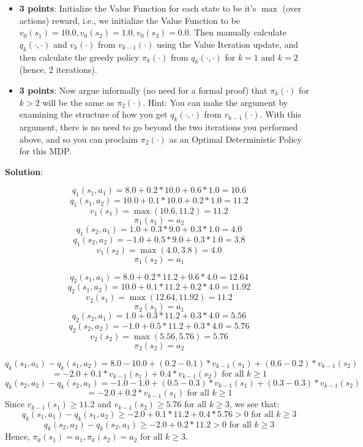 \documentclass[12pt]{exam}
\begin{document}
\begin{questions}
\begin{itemize}
\item {\bf 3 points}: Initialize the Value Function for each state to be it's $\max$ (over actions) reward, i.e., we initialize the Value Function to be $v_0(s_1) = 10.0, v_0(s_2) = 1.0, v_0(s_3) = 0.0$. Then manually calculate $q_k(\cdot, \cdot)$ and $v_k(\cdot)$ from $v_{k - 1}( \cdot)$ using the Value Iteration update, and then calculate the greedy policy $\pi_k(\cdot)$ from $q_k(\cdot, \cdot)$ for $k = 1$ and $k = 2$ (hence, 2 iterations).

\item {\bf 3 points}: Now argue informally (no need for a formal proof) that $\pi_k(\cdot)$ for $k > 2$ will be the same as $\pi_2(\cdot)$. Hint: You can make the argument by examining the structure of how you get $q_k(\cdot, \cdot)$ from $v_{k-1}(\cdot)$. With this argument, there is no need to go beyond the two iterations you performed above, and so you can proclaim $\pi_2(\cdot)$ as an Optimal Deterministic Policy for this MDP.
\end{itemize}

{\bf Solution}:

$$q_1(s_1, a_1) = 8.0 + 0.2 * 10.0 + 0.6 * 1.0 = 10.6$$
$$q_1(s_1, a_2) = 10.0 + 0.1 * 10.0 + 0.2 * 1.0 = 11.2$$
$$v_1(s_1) = \max(10.6, 11.2) = 11.2$$
$$\pi_1(s_1) = a_2$$
$$q_1(s_2, a_1) = 1.0 + 0.3 * 9.0 + 0.3 * 1.0 = 4.0$$
$$q_1(s_2, a_2) = -1.0 + 0.5 * 9.0 + 0.3 * 1.0 = 3.8$$
$$v_1(s_2) = \max(4.0, 3.8) = 4.0$$
$$\pi_1(s_2) = a_1$$

$$q_2(s_1, a_1) = 8.0 + 0.2 * 11.2 + 0.6 * 4.0 = 12.64$$
$$q_2(s_1, a_2) = 10.0 + 0.1 * 11.2 + 0.2 * 4.0 = 11.92$$
$$v_2(s_1) = \max(12.64, 11.92) = 11.2$$
$$\pi_2(s_1) = a_1$$
$$q_2(s_2, a_1) = 1.0 + 0.3 * 11.2 + 0.3 * 4.0 = 5.56$$
$$q_2(s_2, a_2) = -1.0 + 0.5 * 11.2 + 0.3 * 4.0 = 5.76$$
$$v_2(s_2) = \max(5.56, 5.76) = 5.76$$
$$\pi_2(s_2) = a_2$$

$$q_k(s_1, a_1) - q_k(s_1, a_2) = 8.0 - 10.0 + (0.2 - 0.1) * v_{k-1}(s_1) + (0.6 - 0.2) * v_{k-1}(s_2)$$
$$ = -2.0 + 0.1 * v_{k-1}(s_1) + 0.4 * v_{k-1}(s_2)\mbox{ for all } k \geq 1$$
$$q_k(s_2, a_2) - q_k(s_2, a_1) = -1.0 - 1.0 + (0.5 - 0.3) * v_{k-1}(s_1) + (0.3 - 0.3) * v_{k-1}(s_2)$$
$$ = -2.0 + 0.2 * v_{k-1}(s_1) \mbox{ for all } k \geq 1$$
Since $v_{k-1}(s_1) \geq 11.2$ and $v_{k-1}(s_2) \geq 5.76 \mbox{ for all } k \geq 3$, we see that:
$$q_k(s_1, a_1) - q_k(s_1, a_2) \geq -2.0 + 0.1 * 11.2 + 0.4 * 5.76 > 0 \mbox{ for all } k \geq 3$$
$$q_k(s_2, a_2) - q_k(s_2, a_1) \geq -2.0 + 0.2 * 11.2 > 0 \mbox{ for all } k \geq 3$$
Hence, $\pi_k(s_1) = a_1, \pi_k(s_2) = a_2$ for all $k \geq 3$.


\end{questions}
\end{document}

